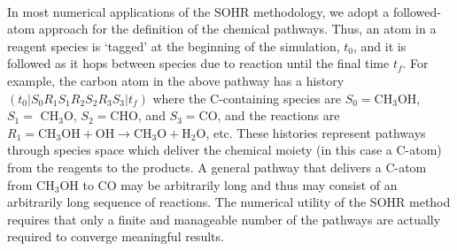 \paragraph{}
In most numerical applications of the SOHR methodology, we adopt a followed-atom
approach for the definition of the chemical pathways. Thus, an atom in a reagent
species is ‘tagged’ at the beginning of the simulation, $t_0$, and it is followed as it hops
between species due to reaction until the final time $t_f$. For example, the carbon atom in
the above pathway has a history $(t_0 \vert S_0R_1S_1R_2S_2R_3S_3|t_f)$ where the C-containing species
are $S_0 = \text{CH}_3\text{OH}$, $S_1 =\text{ CH}_3\text{O}$, $S_2 = \text{CHO}$, and $S_3 = \text{CO}$, and the reactions are
$R_1 = \text{CH}_3\text{OH} + \text{OH} \rightarrow \text{CH}_3\text{O} + \text{H}_2\text{O}$, etc. These histories represent pathways through
species space which deliver the chemical moiety (in this case a C-atom) from the
reagents to the products. A general pathway that delivers a C-atom from CH$_3$OH to CO
may be arbitrarily long and thus may consist of an arbitrarily long sequence of reactions.
The numerical utility of the SOHR method requires that only a finite and manageable
number of the pathways are actually required to converge meaningful results.
\newline
